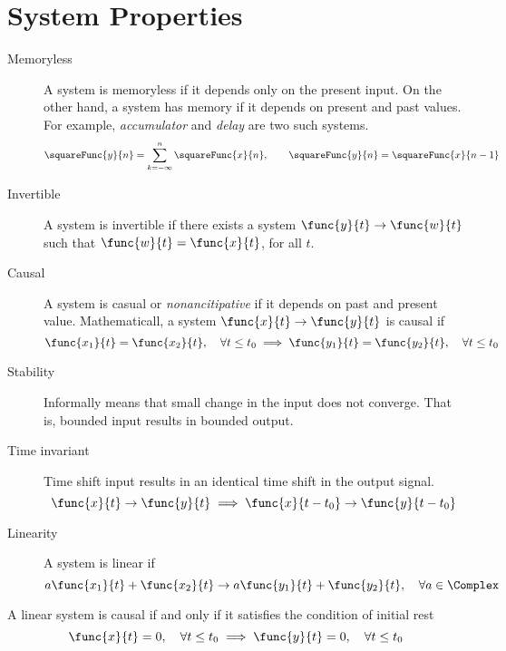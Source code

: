 \section{System Properties}
\begin{description}
    \item[Memoryless] A system is memoryless if it depends only on the present input. On the other hand, a system has memory if it depends on present and past values. For example, \textit{accumulator} and \textit{delay} are two such systems.
    \begin{equation*}
        \squareFunc{y}{n} = \sum_{k = -\infty}^n \squareFunc{x}{n}, \qquad \squareFunc{y}{n} = \squareFunc{x}{n - 1}
    \end{equation*}
    \item[Invertible] A system is invertible if there exists a system \(\func{y}{t} \to \func{w}{t}\) such that \(\func{w}{t} = \func{x}{t}\), for all \(t\).
    \item[Causal] A system is casual or \textit{nonancitipative} if it depends on past and present value. Mathematicall, a system \(\func{x}{t} \to \func{y}{t}\) is causal if 
    \begin{equation*}
        \func{x_1}{t} = \func{x_2}{t},\quad \forall t \leq t_0 \implies \func{y_1}{t} = \func{y_2}{t} , \quad \forall t \leq t_0
    \end{equation*}
    \item[Stability] Informally means that small change in the input does not converge. That is, bounded input results in bounded output.
    \item[Time invariant] Time shift input results in an identical time shift in the output signal. 
    \begin{equation*}
        \func{x}{t} \to \func{y}{t} \implies \func{x}{t- t_0} \to \func{y}{t - t_0}
    \end{equation*}
    \item[Linearity] A system is linear if
    \begin{equation*}
        a \func{x_1}{t} + \func{x_2}{t} \to a \func{y_1}{t} + \func{y_2}{t}, \quad \forall a \in \Complex
    \end{equation*}
\end{description} 
\begin{proposition}
    A linear system is causal if and only if it satisfies the condition of initial rest 
    \begin{equation*}
        \func{x}{t} = 0, \quad  \forall t \leq t_0 \implies \func{y}{t} = 0 ,\quad  \forall t \leq t_0 
    \end{equation*}
\end{proposition}

